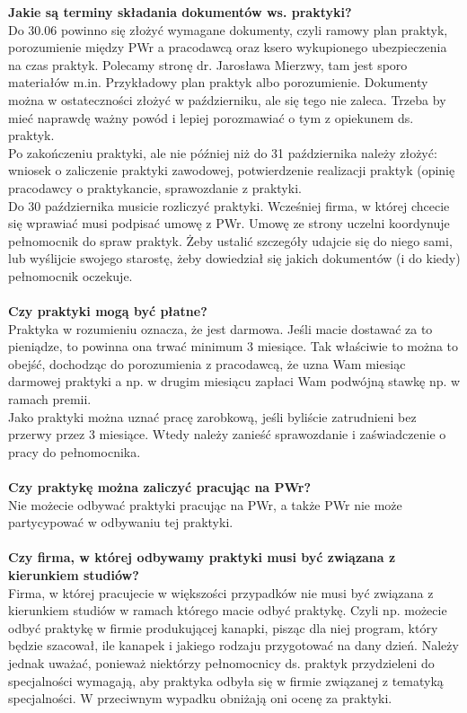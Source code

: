 \documentclass[11pt]{article}
\begin{document}
\textbf{Jakie są terminy składania dokumentów ws. praktyki?} \\
\indent Do 30.06 powinno się złożyć wymagane dokumenty, czyli ramowy plan praktyk, porozumienie między PWr a pracodawcą oraz ksero wykupionego ubezpieczenia na czas praktyk. Polecamy stronę dr. Jarosława Mierzwy, tam jest sporo materiałów m.in. Przykładowy plan praktyk albo porozumienie. Dokumenty można w ostateczności złożyć w październiku, ale się tego nie zaleca. Trzeba by mieć naprawdę ważny powód i lepiej porozmawiać o tym z opiekunem ds. praktyk. \\
\indent Po zakończeniu praktyki, ale nie później niż do 31 października należy złożyć: wniosek o zaliczenie praktyki zawodowej, potwierdzenie realizacji praktyk (opinię pracodawcy o praktykancie, sprawozdanie z praktyki. \\
\indent Do 30 października musicie rozliczyć praktyki. Wcześniej firma, w której chcecie się wprawiać musi podpisać umowę z PWr. Umowę ze strony uczelni koordynuje pełnomocnik do spraw praktyk. Żeby ustalić szczegóły udajcie się do niego sami, lub wyślijcie swojego starostę, żeby dowiedział się jakich dokumentów (i do kiedy) pełnomocnik oczekuje. \\\\
\textbf{Czy praktyki mogą być płatne?} \\
\indent Praktyka w rozumieniu oznacza, że jest darmowa. Jeśli macie dostawać za to pieniądze, to powinna ona trwać minimum 3 miesiące. Tak właściwie to można to obejść, dochodząc do porozumienia z pracodawcą, że uzna Wam miesiąc darmowej praktyki a np. w drugim miesiącu zapłaci Wam podwójną stawkę np. w ramach premii. \\
\indent Jako praktyki można uznać pracę zarobkową, jeśli byliście zatrudnieni bez przerwy przez 3 miesiące. Wtedy należy zanieść sprawozdanie i zaświadczenie o pracy do pełnomocnika. \\\\
\textbf{Czy praktykę można zaliczyć pracując na PWr?} \\
\indent Nie możecie odbywać praktyki pracując na PWr, a także PWr nie może partycypować w odbywaniu tej praktyki. \\\\
\textbf{Czy firma, w której odbywamy praktyki musi być związana z kierunkiem studiów?} \\
\indent Firma, w której pracujecie w większości przypadków nie musi być związana z kierunkiem studiów w ramach którego macie odbyć praktykę. Czyli np. możecie odbyć praktykę w firmie produkującej kanapki, pisząc dla niej program, który będzie szacował, ile kanapek i jakiego rodzaju przygotować na dany dzień. Należy jednak uważać, ponieważ niektórzy pełnomocnicy ds. praktyk przydzieleni do specjalności wymagają, aby praktyka odbyła się w firmie związanej z tematyką specjalności. W przeciwnym wypadku obniżają oni ocenę za praktyki. \\
\end{document}

